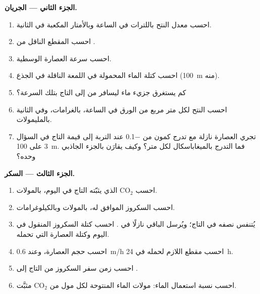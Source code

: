 \begin{problem}
\medskip
\noindent\textbf{الجزء الثاني --- الجريان.}
\begin{enumerate}[resume]
  \item احسب معدل النتح باللترات في الساعة وبالأمتار المكعبة في
        الثانية.
  \item احسب المقطع الناقل من .
  \item احسب سرعة العصارة الوسطية.
  \item احسب كتلة الماء المحمولة في اللمعة الناقلة في الجذع
        (\qty{100}{m} منه).
  \item كم يستغرق جزيء ماء ليسافر من  إلى التاج بتلك السرعة؟
  \item احسب النتح لكل متر مربع من الورق في الساعة، بالغرامات، وفي
        الثانية بالمليمولات.
  \item تجري العصارة نازلة مع تدرج كمون من \qty{-0.1}{} عند التربة
        إلى قيمة التاج في السؤال 3 على \qty{100}{m}. فما التدرج
        بالميغاباسكال لكل متر؟ وكيف يقارَن بالجزء الجاذبي وحده؟
\end{enumerate}

\medskip
\noindent\textbf{الجزء الثالث --- السكر.}
\begin{enumerate}[resume]
  \item احسب $\mathrm{CO_2}$ الذي يثبّته التاج في اليوم،
        بالمولات.
  \item احسب السكروز الموافق له، بالمولات وبالكيلوغرامات.
  \item يُتنفس نصفه في التاج؛ ويُرسل الباقي نازلًا في .
        احسب كتلة السكروز المنقول في اليوم وكتلة العصارة التي
        تحمله.
  \item احسب حجم العصارة، وعند \qty{0.6}{m/h} احسب مقطع  اللازم لحمله في \qty{24}{h}.
  \item احسب زمن سفر السكروز من التاج إلى .
  \item احسب نسبة استعمال الماء: مولات الماء المنتوحة لكل مول من
        $\mathrm{CO_2}$ مثبَّت.
\end{enumerate}


\end{problem}
